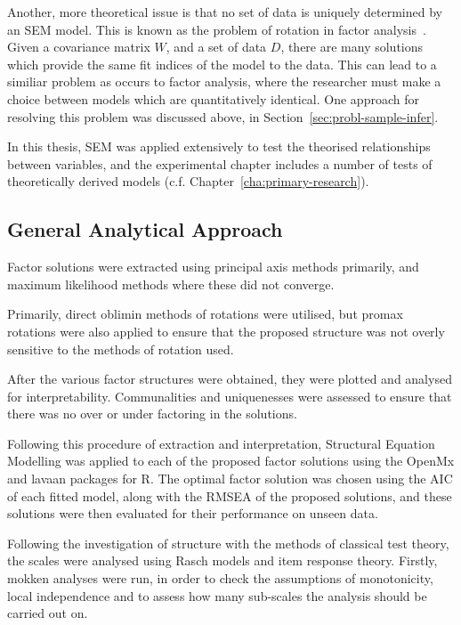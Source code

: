 Another, more theoretical issue is that no set of data is uniquely determined by an SEM model. This is known as the problem of rotation in factor analysis~\cite{maccallum2000applications}. Given a covariance matrix $W$, and a set of data $D$, there are many solutions which provide the same fit indices of the model to the data. This can lead to a similiar problem as occurs to factor analysis, where the researcher must make a choice between models which are quantitatively identical. One approach for resolving this problem was discussed above, in Section~\ref{sec:probl-sample-infer}.

In this thesis, SEM was applied extensively to test the theorised relationships between variables, and the experimental chapter includes a number of tests of theoretically derived models (c.f. Chapter~\ref{cha:primary-research}).

\subsection{General Analytical Approach}
\label{sec:gener-analyt-appr}




Factor solutions were extracted using principal axis methods primarily, and maximum likelihood methods where these did not converge.

Primarily, direct oblimin methods of rotations were utilised, but promax rotations were also applied to ensure that the proposed structure was not overly sensitive to the methods of rotation used.

After the various factor structures were obtained, they were plotted and analysed for interpretability. Communalities and uniquenesses were assessed to ensure that there was no over or under factoring in the solutions. %

Following this procedure of extraction and interpretation, Structural Equation Modelling was applied to each of the proposed factor solutions using the OpenMx and lavaan packages for R. The optimal factor solution was chosen using the AIC of each fitted model, along with the RMSEA of the proposed solutions, and these solutions were then evaluated for their performance on unseen data. 


Following the investigation of structure with the methods of classical test theory, the scales were analysed using Rasch models and item response theory. Firstly, mokken analyses were run, in order to check the assumptions of monotonicity, local independence and to assess how many sub-scales the analysis should be carried out on. 


